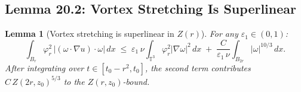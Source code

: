 \documentclass[11pt]{article}
\newtheorem{lemma}[theorem]{Lemma}
\theoremstyle{definition}
\theoremstyle{remark}
\newcommand{\T}{\mathbb{T}}
\newcommand{\abs}[1]{\left|#1\right|}
\begin{document}
\subsection{Lemma 20.2: Vortex Stretching Is Superlinear}

\begin{lemma}[Vortex stretching is superlinear in $Z(r)$]
  \label{lem:stretching-superlinear-20}
  For any $\varepsilon_1\in(0,1)$:
  \begin{equation}\label{eq:stretching-young}
    \int_{B_r}\varphi_r^2\,\abs{(\omega\cdot\nabla u)\cdot\omega}\,dx
    \;\leq\;
    \varepsilon_1\,\nu\int_{\T^3}\varphi_r^2|\nabla\omega|^2\,dx
    \;+\; \frac{C}{\varepsilon_1\,\nu}\int_{B_{2r}}|\omega|^{10/3}\,dx.
  \end{equation}
  After integrating over $t\in[t_0-r^2,t_0]$, the second term contributes
  $C\,Z(2r,z_0)^{5/3}$ to the $Z(r,z_0)$-bound.
\end{lemma}
\end{document}
